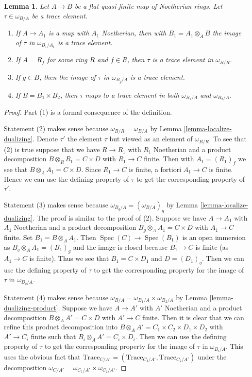 \documentclass[10pt,a4paper]{amsart}
\theoremstyle{plain}
\newtheorem{lemma}[subsection]{Lemma}
\theoremstyle{definition}
\theoremstyle{remark}
\numberwithin{equation}{subsection}
\def\Spec{\mathop{\mathrm{Spec}}}
\begin{document}
\begin{lemma}
\label{lemma-trace-base-change}
Let $A \to B$ be a flat quasi-finite map of Noetherian rings.
Let $\tau \in \omega_{B/A}$ be a trace element.
\begin{enumerate}
\item If $A \to A_1$ is a map with $A_1$ Noetherian, then with
$B_1 = A_1 \otimes_A B$ the image of $\tau$ in $\omega_{B_1/A_1}$ is a
trace element.
\item If $A = R_f$ for some ring $R$ and $f \in R$, then
$\tau$ is a trace element in $\omega_{B/R}$.
\item If $g \in B$, then the image of $\tau$ in $\omega_{B_g/A}$
is a trace element.
\item If $B = B_1 \times B_2$, then $\tau$ maps to a trace element
in both $\omega_{B_1/A}$ and $\omega_{B_2/A}$.
\end{enumerate}
\end{lemma}

\begin{proof}
Part (1) is a formal consequence of the definition.

\medskip\noindent
Statement (2) makes sense because $\omega_{B/R} = \omega_{B/A}$
by Lemma \ref{lemma-localize-dualizing}. Denote $\tau'$ the element
$\tau$ but viewed as an element of $\omega_{B/R}$. To see that (2) is true
suppose that we have $R \to R_1$ with $R_1$ Noetherian and a product
decomposition $B \otimes_R R_1 = C \times D$ with $R_1 \to C$ finite.
Then with $A_1 = (R_1)_f$ we see that $B \otimes_A A_1 = C \times D$.
Since $R_1 \to C$ is finite, a fortiori $A_1 \to C$ is finite.
Hence we can use the defining property of $\tau$ to get the corresponding
property of $\tau'$.

\medskip\noindent
Statement (3) makes sense because $\omega_{B_g/A} = (\omega_{B/A})_g$
by Lemma \ref{lemma-localize-dualizing}. The proof is similar to the proof
of (2). Suppose we have $A \to A_1$ with $A_1$ Noetherian and
a product decomposition $B_g \otimes_A A_1 = C \times D$ with $A_1 \to C$
finite. Set $B_1 = B \otimes_A A_1$. Then
$\Spec(C) \to \Spec(B_1)$ is an open immersion as $B_g \otimes_A A_1 = (B_1)_g$
and the image is closed because $B_1 \to C$ is finite
(as $A_1 \to C$ is finite).
Thus we see that $B_1 = C \times D_1$ and $D = (D_1)_g$. Then we can use
the defining property of $\tau$ to get the corresponding property
for the image of $\tau$ in $\omega_{B_g/A}$.

\medskip\noindent
Statement (4) makes sense because
$\omega_{B/A} = \omega_{B_1/A} \times \omega_{B_2/A}$ by
Lemma \ref{lemma-dualizing-product}.
Suppose we have $A \to A'$ with $A'$ Noetherian and
a product decomposition $B \otimes_A A' = C \times D$ with $A' \to C$
finite. Then it is clear that we can refine this product
decomposition into  $B \otimes_A A' = C_1 \times C_2 \times D_1 \times D_2$
with $A' \to C_i$ finite such that $B_i \otimes_A A' = C_i \times D_i$.
Then we can use the defining property of $\tau$ to get the corresponding
property for the image of $\tau$ in $\omega_{B_i/A}$. This uses the obvious
fact that
$\text{Trace}_{C/A'} = (\text{Trace}_{C_1/A'}, \text{Trace}_{C_2/A'})$
under the decomposition
$\omega_{C/A'} = \omega_{C_1/A'} \times \omega_{C_2/A'}$.
\end{proof}
\end{document}
